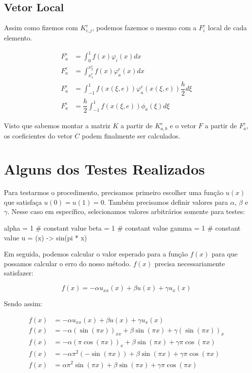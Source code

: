 \section{Vetor Local}

  Assim como fizemos com $K^e_{i,j}$, podemos fazemos o mesmo com a $F_i^e$ local de cada elemento.

  \begin{align*}
    F_a^e &= \int_{0}^{1} f(x) \varphi_i(x) dx \\
    F_a^e &= \int_{x_1^e}^{x_2^e} f(x) \varphi_a^e(x) dx \\
    F_a^e &= \int_{-1}^{1} f(x(\xi, e)) \varphi_a^e(x(\xi, e))\dfrac{h}{2} d\xi \\
    F_a^e &= \dfrac{h}{2} \int_{-1}^{1} f(x(\xi, e)) \phi_a(\xi) d\xi
  \end{align*}

  Visto que sabemos montar a matriz $K$ a partir de $K^e_{a,b}$ e o vetor $F$ a partir de $F_a^e$, os coeficientes do vetor $C$ podem finalmente ser calculados.

\chapter{Alguns dos Testes Realizados}

  Para testarmos o procedimento, precisamos primeiro escolher uma função $u(x)$ que satisfaça $u(0) = u(1) = 0$. Também precisamos definir valores para $\alpha$, $\beta$ e $\gamma$. Nesse caso em específico, selecionamos valores arbitrários somente para testes:

  \begin{code}
  alpha = 1                               # constant value
  beta = 1                                # constant value
  gamma = 1                               # constant value
  u = (x) -> sin(pi * x)
  \end{code}

  Em seguida, podemos calcular o valor esperado para a função $f(x)$ para que possamos calcular o erro do nosso método. $f(x)$ precisa necessariamente satisfazer:

  \[f(x) = -\alpha u_{xx}(x) + \beta u(x) + \gamma u_{x}(x)\]

  Sendo assim:

  \begin{align*}
    f(x) &= -\alpha u_{xx}(x) + \beta u(x) + \gamma u_{x}(x) \\
    f(x) &= -\alpha (\sin(\pi x))_{xx} + \beta \sin(\pi x) + \gamma (\sin(\pi x))_{x} \\
    f(x) &= -\alpha (\pi \cos(\pi x))_{x} + \beta \sin(\pi x) + \gamma \pi \cos(\pi x) \\
    f(x) &= -\alpha \pi^2 (- \sin(\pi x)) + \beta \sin(\pi x) + \gamma \pi \cos(\pi x) \\
    f(x) &= \alpha \pi^2 \sin(\pi x) + \beta \sin(\pi x) + \gamma \pi \cos(\pi x) \\
  \end{align*}

